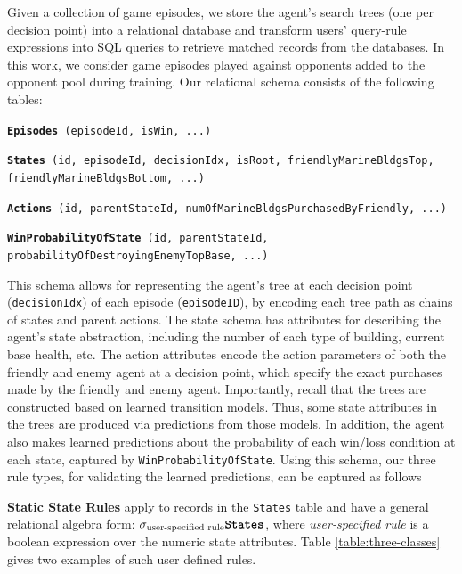 \documentclass[letterpaper]{article} %
\begin{document}
Given a collection of game episodes, we store the agent's search trees (one per decision point) into a relational database and transform users' query-rule expressions into SQL queries to retrieve matched records from the databases. In this work, we consider game episodes played against opponents added to the opponent pool during training. 
Our relational schema consists of the following tables: 
\begin{itemize}[itemsep=0pt,topsep=1pt]
{\small
    \item \texttt{\textbf{Episodes} (episodeId, isWin, ...)}
    \item \texttt{\textbf{States} (id, episodeId, decisionIdx, isRoot,  friendlyMarineBldgsTop, friendlyMarineBldgsBottom, ...)}
    \item \texttt{\textbf{Actions} (id, parentStateId, numOfMarineBldgsPurchasedByFriendly, 
    ...)} 
    \item \texttt{\textbf{WinProbabilityOfState} (id, parentStateId, probabilityOfDestroyingEnemyTopBase, ...)}
}
\end{itemize}
This schema allows for representing the agent's tree at each decision point (\texttt{\small decisionIdx}) of each episode (\texttt{\small episodeID}), by encoding each tree path as chains of states and parent actions. The state schema has attributes for describing the agent's state abstraction, including the number of each type of building, current base health, etc. The action attributes encode the action parameters of both the friendly and enemy agent at a decision point, which specify the exact purchases made by the friendly and enemy agent. Importantly, recall that the trees are constructed based on learned transition models. Thus, some state attributes in the trees are produced via predictions from those models. In addition, the agent also makes learned predictions about the probability of each win/loss condition at each state, captured by \texttt{WinProbabilityOfState}. Using this schema, our three rule types, for validating the learned predictions, can be captured as follows 

\textbf{Static State Rules} apply to records in the \texttt{States} table and have a general relational algebra form:
$\sigma_{\textnormal{user-specified rule}} \textnormal{\texttt{\textbf{States}}}$,
where \emph{user-specified rule} is a boolean expression over the numeric state attributes. Table \ref{table:three-classes} gives two examples of such user defined rules. 
\end{document}
